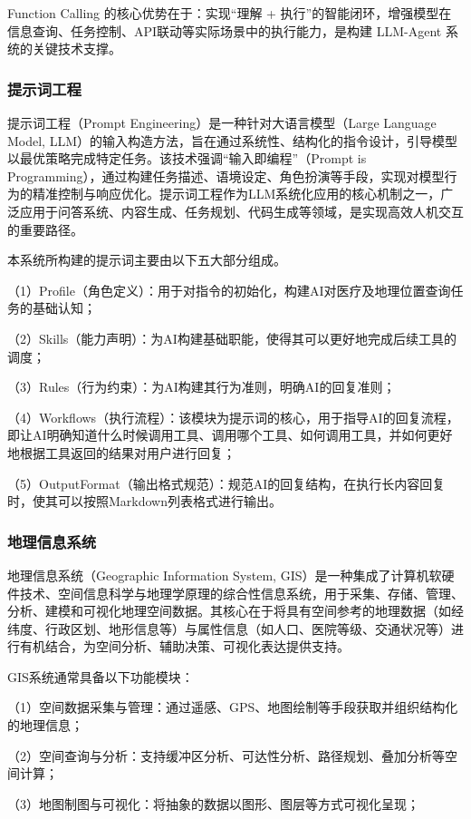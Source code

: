 \documentclass[fleqn,10pt]{IntroToAI} %
\begin{document}
Function Calling 的核心优势在于：实现“理解 + 执行”的智能闭环，增强模型在信息查询、任务控制、API联动等实际场景中的执行能力，是构建 LLM-Agent 系统的关键技术支撑。

\subsubsection{提示词工程}

提示词工程（Prompt Engineering）是一种针对大语言模型（Large Language Model, LLM）的输入构造方法，旨在通过系统性、结构化的指令设计，引导模型以最优策略完成特定任务。该技术强调“输入即编程”（Prompt is Programming），通过构建任务描述、语境设定、角色扮演等手段，实现对模型行为的精准控制与响应优化。提示词工程作为LLM系统化应用的核心机制之一，广泛应用于问答系统、内容生成、任务规划、代码生成等领域，是实现高效人机交互的重要路径。

本系统所构建的提示词主要由以下五大部分组成。

（1）Profile（角色定义）：用于对指令的初始化，构建AI对医疗及地理位置查询任务的基础认知；

（2）Skills（能力声明）：为AI构建基础职能，使得其可以更好地完成后续工具的调度；

（3）Rules（行为约束）：为AI构建其行为准则，明确AI的回复准则；

（4）Workflows（执行流程）：该模块为提示词的核心，用于指导AI的回复流程，即让AI明确知道什么时候调用工具、调用哪个工具、如何调用工具，并如何更好地根据工具返回的结果对用户进行回复；

（5）OutputFormat（输出格式规范）：规范AI的回复结构，在执行长内容回复时，使其可以按照Markdown列表格式进行输出。

\subsubsection{地理信息系统}
地理信息系统（Geographic Information System, GIS）是一种集成了计算机软硬件技术、空间信息科学与地理学原理的综合性信息系统，用于采集、存储、管理、分析、建模和可视化地理空间数据。其核心在于将具有空间参考的地理数据（如经纬度、行政区划、地形信息等）与属性信息（如人口、医院等级、交通状况等）进行有机结合，为空间分析、辅助决策、可视化表达提供支持。

GIS系统通常具备以下功能模块：

（1）空间数据采集与管理：通过遥感、GPS、地图绘制等手段获取并组织结构化的地理信息；

（2）空间查询与分析：支持缓冲区分析、可达性分析、路径规划、叠加分析等空间计算；

（3）地图制图与可视化：将抽象的数据以图形、图层等方式可视化呈现；
\end{document}
